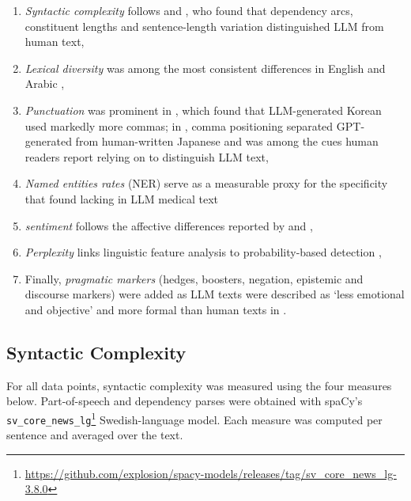 \documentclass[thesis]{cluu}
\begin{document}
\begin{enumerate}
    \item \textit{Syntactic complexity} follows \textcite{munoz-ortiz2024contrasting} and \textcite{liao2023differentiating}, who found that dependency arcs, constituent lengths and sentence-length variation distinguished LLM from human text, 
    \item \textit{Lexical diversity} was among the most consistent differences in English \parencite{munoz-ortiz2024contrasting, liao2023differentiating} and Arabic \parencite{alshaibani2025arabicaifingerprintstylometric}, 
    \item \textit{Punctuation} was prominent in \parencite{park2025katfishnet}, which found that LLM-generated Korean used markedly more commas; in \parencite{zaitsu2023distinguishing}, comma positioning separated GPT-generated from human-written Japanese and was among the cues human readers report relying on to distinguish LLM text, 
    \item \textit{Named entities rates} (NER) serve as a measurable proxy for the specificity that \textcite{liao2023differentiating} found lacking in LLM medical text
    \item \textit{sentiment} follows the affective differences reported by \textcite{munoz-ortiz2024contrasting} and \textcite{tang2023sciencedetectingllmgeneratedtexts}, 
    \item  \textit{Perplexity} links linguistic feature analysis to probability-based detection \parencite{mitchell2023detectgpt}, 
    \item Finally, \textit{pragmatic markers} (hedges, boosters, negation, epistemic and discourse markers) were added as LLM texts were described as `less emotional and objective' and more formal than human texts in \textcite{tang2023sciencedetectingllmgeneratedtexts}.
\end{enumerate}

\subsection{Syntactic Complexity}
For all data points, syntactic complexity was measured using the four measures
below. Part-of-speech and dependency parses were obtained with spaCy's
\texttt{sv\_core\_news\_lg}\footnote{\url{https://github.com/explosion/spacy-models/releases/tag/sv_core_news_lg-3.8.0}}
Swedish-language model. Each measure was computed per sentence and averaged over the text.
\end{document}
